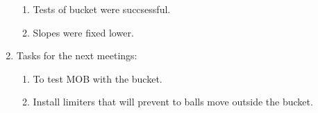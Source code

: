 \begin{enumerate}
\begin{enumerate}
	  \item Tests of bucket were succsessful.
	  
	  \item Slopes were fixed lower.
	  
    \end{enumerate}
    
	\item Tasks for the next meetings:
	\begin{enumerate}
	  \item To test MOB with the bucket.
	  
	  \item Install limiters that will prevent to balls move outside the bucket.
	  	  
    \end{enumerate}     
\end{enumerate}
